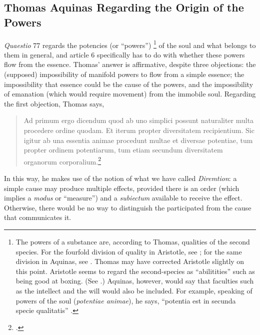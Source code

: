 \subsection{Thomas Aquinas Regarding the Origin of the Powers}
\label{sec:origin-of-powers}

\emph{Quaestio} 77 regards the potencies (or “powers”)%
%
\footnote{The powers of a substance are, according to Thomas, qualities of the second species. For the fourfold division of quality in Aristotle, see \cite[8b25-10a14]{aristotle:categories}; for the same division in Aquinas, see \cite[I-II, q.~49, a.~2, co.]{st:summa}. Thomas may have corrected Aristotle slightly on this point. Aristotle seems to regard the second-species as “abilitities” such as being good at boxing. (See \cite[9a14-17]{aristotle:categories}.) Aquinas, however, would say that faculties such as the intellect and the will would also be included. For example, speaking of powers of the soul (\emph{potentiae animae}), he says, “potentia est in secunda specie qualitatis”  \parencite[I-II, q.~56. a.~1, arg.~3]{st:summa}.} of the soul and what belongs to them in general, and article 6 specifically has to do with whether these powers flow from the essence. Thomas’ answer is affirmative, despite three objections: the (supposed) impossibility of manifold powers to flow from a simple essence; the impossibility that essence could be the cause of the powers, and the impossibility of emanation (which would require movement) from the immobile soul. Regarding the first objection, Thomas says,
%
\begin{quotation}
Ad primum ergo dicendum quod ab uno simplici possunt naturaliter multa procedere ordine quodam. Et iterum propter diversitatem recipientium. Sic igitur ab una essentia animae procedunt multae et diversae potentiae, tum propter ordinem potentiarum, tum etiam secundum diversitatem organorum corporalium.\footcite[I, q.~77, a.~6, ad 1]{st:summa}
\end{quotation}
%
In this way, he makes use of the notion of what we have called \emph{Diremtion}: a simple cause may produce multiple effects, provided there is an order (which implies a \emph{modus} or “measure”) and a \emph{subiectum} available to receive the effect. Otherwise, there would be no way to distinguish the participated from the cause that communicates it.

